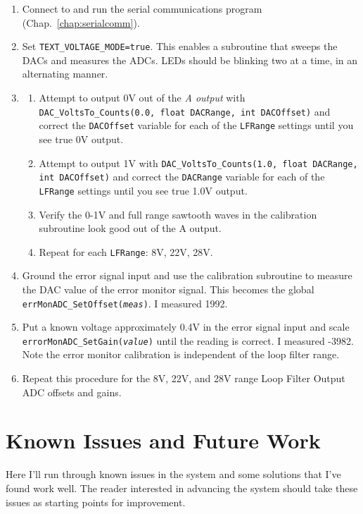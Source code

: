 \documentclass[10pt]{report}
\begin{document}
\begin{enumerate}
	\item Connect to and run the serial communications program (Chap.~\ref{chap:serialcomm}).
	\item Set \texttt{TEXT\_VOLTAGE\_MODE=true}. This enables a subroutine that sweeps the DACs and measures the ADCs. LEDs should be blinking two at a time, in an alternating manner.
	\item \begin{enumerate}
		\item Attempt to output 0V out of the \textit{A output} with \texttt{DAC\_VoltsTo\_Counts(0.0, float DACRange, int DACOffset)} and correct the \texttt{DACOffset} variable for each of the \texttt{LFRange} settings until you see true 0V output.
	\item Attempt to output 1V with \texttt{DAC\_VoltsTo\_Counts(1.0, float DACRange, int DACOffset)} and correct the \texttt{DACRange} variable for each of the \texttt{LFRange} settings until you see true 1.0V output.
	\item Verify the 0-1V and full range sawtooth waves in the calibration subroutine look good out of the A output.
	\item Repeat for each \texttt{LFRange}: 8V, 22V, 28V.
	\end{enumerate}
	\item Ground the error signal input and use the calibration subroutine to measure the DAC value of the error monitor signal. This becomes the global \texttt{errMonADC\_SetOffset(\textit{\textit{meas}})}. I measured 1992.
	\item Put a known voltage approximately 0.4V in the error signal input and scale \texttt{errorMonADC\_SetGain(\textit{value})} until the reading is correct. I measured -3982. Note the error monitor calibration is independent of the loop filter range.
	\item Repeat this procedure for the 8V, 22V, and 28V range Loop Filter Output ADC offsets and gains.
\end{enumerate}


\chapter{Known Issues and Future Work}
\label{chap:knownIssuesAndFutureWork}

Here I'll run through known issues in the system and some solutions that I've found work well. The reader interested in advancing the system should take these issues as starting points for improvement.
\end{document}
